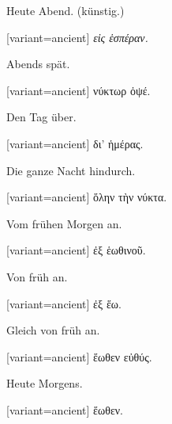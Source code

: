 Heute Abend. (künstig.)

\switchcolumn

\begin{greek}[variant=ancient]%
\emph{εἰς ἑσπέραν.}

\end{greek}%
\switchcolumn*

Abends spät.

\switchcolumn

\begin{greek}[variant=ancient]%
νύκτωρ ὀψέ.

\end{greek}%
\switchcolumn*

Den Tag über.

\switchcolumn

\begin{greek}[variant=ancient]%
δι' ἡμέρας.

\end{greek}%
\switchcolumn*

Die ganze Nacht hindurch.

\switchcolumn

\begin{greek}[variant=ancient]%
ὅλην τὴν νύκτα.

\end{greek}%
\switchcolumn*

Vom frühen Morgen an.

\switchcolumn

\begin{greek}[variant=ancient]%
ἐξ ἑωθινοῦ.

\end{greek}%
\switchcolumn*

Von früh an.

\switchcolumn

\begin{greek}[variant=ancient]%
ἐξ ἕω.

\end{greek}%
\switchcolumn*

Gleich von früh an.

\switchcolumn

\begin{greek}[variant=ancient]%
ἕωθεν εὐθύς.

\end{greek}%
\switchcolumn*

Heute Morgens.

\switchcolumn

\begin{greek}[variant=ancient]%
ἕωθεν.

\end{greek}%
\switchcolumn*

